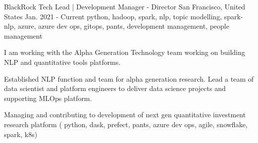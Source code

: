 \cventry
    {BlackRock} %
    {Tech Lead | Development Manager - Director} %
    {San Francisco, United States} %
    {Jan. 2021 - Current} %
    { python, hadoop, spark, nlp, topic modelling, spark-nlp, azure, azure dev ops, gitops, pants, development management, people management} %
    {
        I am working with the Alpha Generation Technology team working on building NLP and quantitative tools platforms.
    \begin{cvitems} %
        \item { Established NLP function and team for alpha generation research. Lead a team of data scientist and platform engineers to deliver data science projects and supporting MLOps platform. }
        \item { Managing and contributing to development of next gen quantitative investment research platform ( python, dask, prefect, pants, azure dev ops, agile, snowflake, spark, k8s) }
    \end{cvitems}
    }
